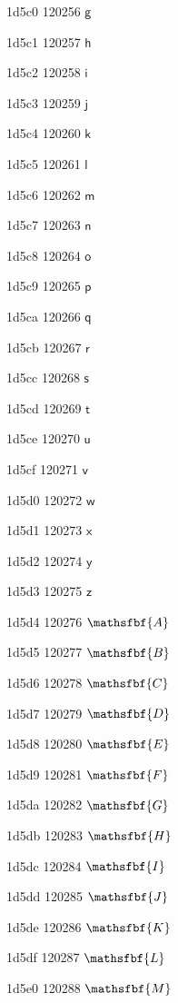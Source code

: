 \documentclass[11pt]{article}
\begin{document}
1d5c0 120256 \ensuremath{\mathsf{g}}

1d5c1 120257 \ensuremath{\mathsf{h}}

1d5c2 120258 \ensuremath{\mathsf{i}}

1d5c3 120259 \ensuremath{\mathsf{j}}

1d5c4 120260 \ensuremath{\mathsf{k}}

1d5c5 120261 \ensuremath{\mathsf{l}}

1d5c6 120262 \ensuremath{\mathsf{m}}

1d5c7 120263 \ensuremath{\mathsf{n}}

1d5c8 120264 \ensuremath{\mathsf{o}}

1d5c9 120265 \ensuremath{\mathsf{p}}

1d5ca 120266 \ensuremath{\mathsf{q}}

1d5cb 120267 \ensuremath{\mathsf{r}}

1d5cc 120268 \ensuremath{\mathsf{s}}

1d5cd 120269 \ensuremath{\mathsf{t}}

1d5ce 120270 \ensuremath{\mathsf{u}}

1d5cf 120271 \ensuremath{\mathsf{v}}

1d5d0 120272 \ensuremath{\mathsf{w}}

1d5d1 120273 \ensuremath{\mathsf{x}}

1d5d2 120274 \ensuremath{\mathsf{y}}

1d5d3 120275 \ensuremath{\mathsf{z}}

1d5d4 120276 \ensuremath{\mathsfbf{A}}

1d5d5 120277 \ensuremath{\mathsfbf{B}}

1d5d6 120278 \ensuremath{\mathsfbf{C}}

1d5d7 120279 \ensuremath{\mathsfbf{D}}

1d5d8 120280 \ensuremath{\mathsfbf{E}}

1d5d9 120281 \ensuremath{\mathsfbf{F}}

1d5da 120282 \ensuremath{\mathsfbf{G}}

1d5db 120283 \ensuremath{\mathsfbf{H}}

1d5dc 120284 \ensuremath{\mathsfbf{I}}

1d5dd 120285 \ensuremath{\mathsfbf{J}}

1d5de 120286 \ensuremath{\mathsfbf{K}}

1d5df 120287 \ensuremath{\mathsfbf{L}}

1d5e0 120288 \ensuremath{\mathsfbf{M}}
\end{document}
